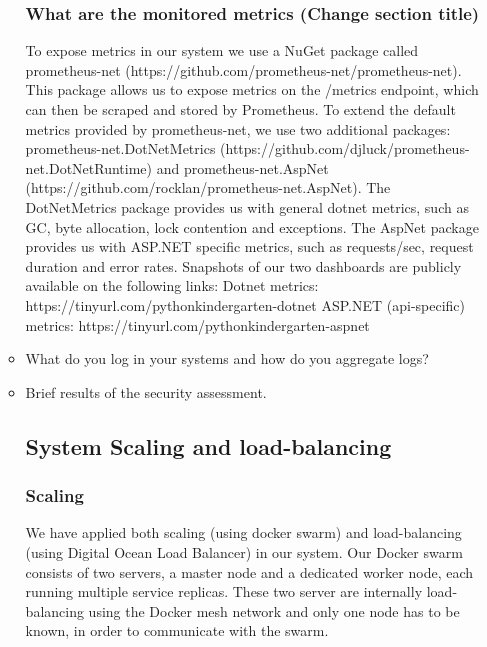 \begin{itemize}
\begin{itemize}
  \subsubsection{What are the monitored metrics (Change section title)}
  To expose metrics in our system we use a NuGet package called prometheus-net (https://github.com/prometheus-net/prometheus-net).
  This package allows us to expose metrics on the /metrics endpoint, which can then be scraped and stored by Prometheus.
  \newline
  To extend the default metrics provided by prometheus-net, we use two additional packages: 
  prometheus-net.DotNetMetrics (https://github.com/djluck/prometheus-net.DotNetRuntime) and prometheus-net.AspNet (https://github.com/rocklan/prometheus-net.AspNet).
  \newline
  The DotNetMetrics package provides us with general dotnet metrics, such as GC, byte allocation, lock contention and exceptions.
  \newline
  The AspNet package provides us with ASP.NET specific metrics, such as requests/sec, request duration and error rates.
  \newline
  \newline
  Snapshots of our two dashboards are publicly available on the following links:
  \newline
  Dotnet metrics: https://tinyurl.com/pythonkindergarten-dotnet
  \newline
  ASP.NET (api-specific) metrics: https://tinyurl.com/pythonkindergarten-aspnet
  \item What do you log in your systems and how do you aggregate logs?
  \item Brief results of the security assessment.
  \subsection{System Scaling and load-balancing}
  \subsubsection{Scaling}
  We have applied both scaling (using docker swarm) and load-balancing (using Digital Ocean Load Balancer) in our system. 
  Our Docker swarm consists of two servers, a master node and a dedicated worker node, each running multiple service replicas. 
  These two server are internally load-balancing using the Docker mesh network and only one node has to be known, in order to communicate with the swarm.


\end{itemize}
\end{itemize}
